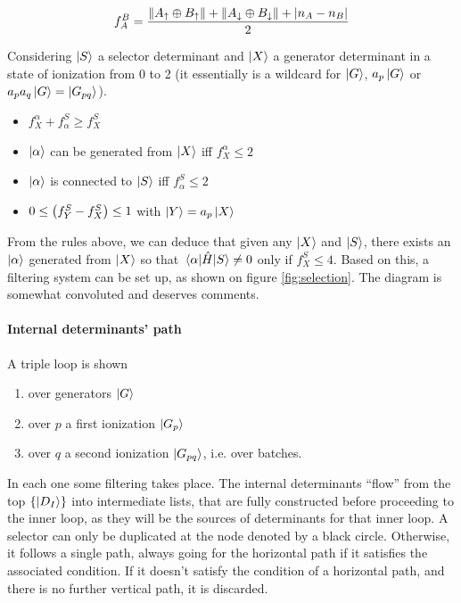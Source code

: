 \documentclass[./thesis.tex]{subfiles}
\begin{document}
\begin{equation}
f_A^B = \frac{\norm{A_\uparrow \oplus B_\uparrow} + \norm{A_\downarrow \oplus B_\downarrow} + |n_A-n_B|}{2}
\end{equation}


Considering $\ket S$ a selector determinant and $\ket X$ a generator determinant in a state of ionization from 0 to 2 (it essentially is a wildcard for $\ket G$, $a_{p} \ket G$ or $a_{p} a_{q} \ket G = \ket {G_{pq}}$).

\begin{itemize}
\item
$f_X^\alpha + f_\alpha^S \geq f_X^S$
\item
$\ket \alpha$ can be generated from $\ket X$ iff $f_X^\alpha \leq 2$
\item
$\ket \alpha$ is connected to $\ket S$ iff $f_\alpha^S \leq 2$
\item
$0 \leq \qty(f_Y^S - f_X^S) \leq 1$ with $\ket Y = a_p \ket X$
\end{itemize}


From the rules above, we can deduce that given any $\ket X$ and $\ket S$, there exists an ${\ket{\alpha}}$ generated from $\ket X$ so that $\mel{\alpha}{\hat{H}}{S} \neq 0$ only if $f_X^S \leq 4$.
Based on this, a filtering system can be set up, as shown on figure \ref{fig:selection}. The diagram is somewhat convoluted and deserves comments.

\paragraph{Internal determinants' path}
 
A triple loop is shown

\begin{enumerate}
\item
over generators $\ket G$
\item
over $p$ a first ionization $\ket{G_p}$
\item
over $q$ a second ionization $\ket{G_{pq}}$, i.e. over batches.
\end{enumerate}

In each one some filtering takes place. The internal determinants ``flow'' from the top $\{ {\ket{D_I}} \}$ into intermediate lists, that are fully constructed before proceeding to the inner loop, as they will be the sources of determinants for that inner loop.
A selector can only be duplicated at the node denoted by a black circle. Otherwise, it follows a single path, always going for the horizontal path if it satisfies the associated condition.
If it doesn't satisfy the condition of a horizontal path, and there is no further vertical path, it is discarded.
\end{document}
